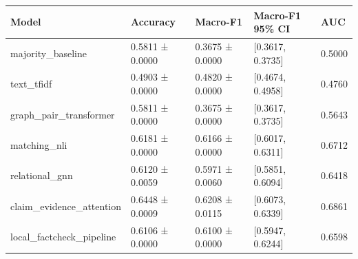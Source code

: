 \begin{tabular}{lllll}
\toprule
Model & Accuracy & Macro-F1 & Macro-F1 95\% CI & AUC \\
\midrule
majority\_baseline & 0.5811 ± 0.0000 & 0.3675 ± 0.0000 & [0.3617, 0.3735] & 0.5000 \\
text\_tfidf & 0.4903 ± 0.0000 & 0.4820 ± 0.0000 & [0.4674, 0.4958] & 0.4760 \\
graph\_pair\_transformer & 0.5811 ± 0.0000 & 0.3675 ± 0.0000 & [0.3617, 0.3735] & 0.5643 \\
matching\_nli & 0.6181 ± 0.0000 & 0.6166 ± 0.0000 & [0.6017, 0.6311] & 0.6712 \\
relational\_gnn & 0.6120 ± 0.0059 & 0.5971 ± 0.0060 & [0.5851, 0.6094] & 0.6418 \\
claim\_evidence\_attention & 0.6448 ± 0.0009 & 0.6208 ± 0.0115 & [0.6073, 0.6339] & 0.6861 \\
local\_factcheck\_pipeline & 0.6106 ± 0.0000 & 0.6100 ± 0.0000 & [0.5947, 0.6244] & 0.6598 \\
\bottomrule
\end{tabular}
